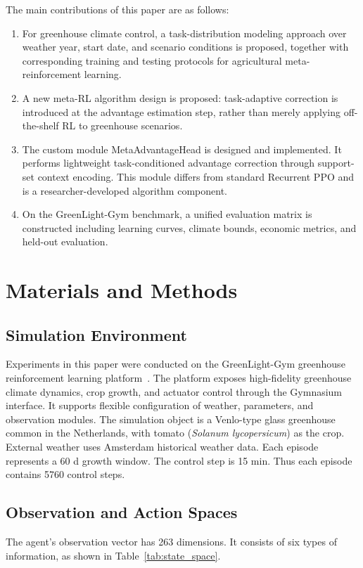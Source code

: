 \documentclass[number,preprint,review,12pt]{elsarticle}
\begin{document}
The main contributions of this paper are as follows:
\begin{enumerate}
    \item For greenhouse climate control, a task-distribution modeling approach over weather year, start date, and scenario conditions is proposed, together with corresponding training and testing protocols for agricultural meta-reinforcement learning.
    \item A new meta-RL algorithm design is proposed: task-adaptive correction is introduced at the advantage estimation step, rather than merely applying off-the-shelf RL to greenhouse scenarios.
    \item The custom module MetaAdvantageHead is designed and implemented. It performs lightweight task-conditioned advantage correction through support-set context encoding. This module differs from standard Recurrent PPO and is a researcher-developed algorithm component.
    \item On the GreenLight-Gym benchmark, a unified evaluation matrix is constructed including learning curves, climate bounds, economic metrics, and held-out evaluation.
\end{enumerate}

\section{Materials and Methods}
\subsection{Simulation Environment}
Experiments in this paper were conducted on the GreenLight-Gym greenhouse reinforcement learning platform~\cite{van2025greenlight,vanhenten2006greenhouse,taksen2024gymnasium}. The platform exposes high-fidelity greenhouse climate dynamics, crop growth, and actuator control through the Gymnasium interface. It supports flexible configuration of weather, parameters, and observation modules. The simulation object is a Venlo-type glass greenhouse common in the Netherlands, with tomato (\textit{Solanum lycopersicum}) as the crop. External weather uses Amsterdam historical weather data. Each episode represents a 60 d growth window. The control step is 15 min. Thus each episode contains 5760 control steps.

\subsection{Observation and Action Spaces}
The agent's observation vector has 263 dimensions. It consists of six types of information, as shown in Table~\ref{tab:state_space}.
\end{document}
